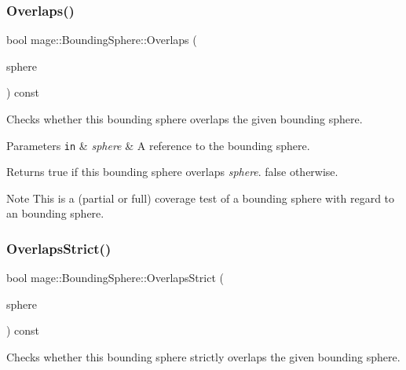 \subsubsection{\texorpdfstring{Overlaps()}{Overlaps()}}
{\footnotesize\ttfamily bool mage\+::\+Bounding\+Sphere\+::\+Overlaps (\begin{DoxyParamCaption}\item[{const \hyperlink{classmage_1_1_bounding_sphere}{Bounding\+Sphere} \&}]{sphere }\end{DoxyParamCaption}) const\hspace{0.3cm}{\ttfamily [noexcept]}}

Checks whether this bounding sphere overlaps the given bounding sphere.


\begin{DoxyParams}[1]{Parameters}
\mbox{\tt in}  & {\em sphere} & A reference to the bounding sphere. \\
\hline
\end{DoxyParams}
\begin{DoxyReturn}{Returns}
{\ttfamily true} if this bounding sphere overlaps {\itshape sphere}. {\ttfamily false} otherwise. 
\end{DoxyReturn}
\begin{DoxyNote}{Note}
This is a (partial or full) coverage test of a bounding sphere with regard to an bounding sphere. 
\end{DoxyNote}
\hypertarget{classmage_1_1_bounding_sphere_a352314bd02664521a516ac5d0ce4a5a4}{}\label{classmage_1_1_bounding_sphere_a352314bd02664521a516ac5d0ce4a5a4} 
\subsubsection{\texorpdfstring{Overlaps\+Strict()}{OverlapsStrict()}}
{\footnotesize\ttfamily bool mage\+::\+Bounding\+Sphere\+::\+Overlaps\+Strict (\begin{DoxyParamCaption}\item[{const \hyperlink{classmage_1_1_bounding_sphere}{Bounding\+Sphere} \&}]{sphere }\end{DoxyParamCaption}) const\hspace{0.3cm}{\ttfamily [noexcept]}}

Checks whether this bounding sphere strictly overlaps the given bounding sphere.


